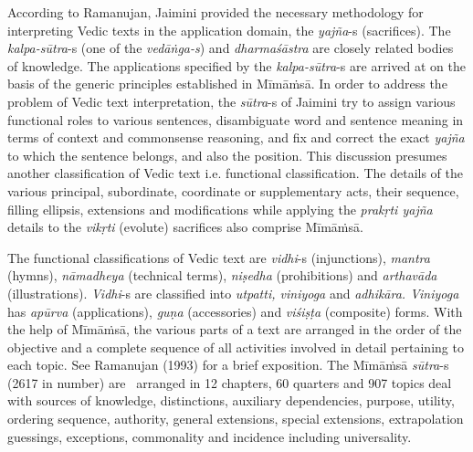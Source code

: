 According to Ramanujan, Jaimini provided the necessary methodology for interpreting Vedic texts in the application domain, the \textit{yajña}-s (sacrifices). The \textit{kalpa-sūtra}-s (one of the \textit{vedāṅga-s}) and \textit{dharmaśāstra} are closely related bodies of knowledge. The applications specified by the \textit{kalpa-sūtra}-s are arrived at on the basis of the generic principles established in Mīmāṁsā. In order to address the problem of Vedic text interpretation, the \textit{sūtra}-s of Jaimini try to assign various functional roles to various sentences, disambiguate word and sentence meaning in terms of context and commonsense reasoning, and fix and correct the exact \textit{yajña} to which the sentence belongs, and also the position. This discussion presumes another classification of Vedic text i.e. functional classification. The details of the various principal, subordinate, coordinate or supplementary acts, their sequence, filling ellipsis, extensions and modifications while applying the \textit{prakṛti yajña} details to the \textit{vikṛti} (evolute) sacrifices also comprise Mīmāṁsā.

\vskip 3pt

The functional classifications of Vedic text are \textit{vidhi}-s (injunctions), \textit{mantra} (hymns), \textit{nāmadheya} (technical terms), \textit{niṣedha} (prohibitions) and \textit{arthavāda} (illustrations). \textit{Vidhi}-s are classified into \textit{utpatti, viniyoga} and \textit{adhikāra. Viniyoga} has \textit{apūrva} (applications), \textit{guṇa} (accessories) and \textit{viśiṣṭa} (composite) forms. With the help of Mīmāṁsā, the various parts of a text are arranged in the order of the objective and a complete sequence of all activities involved in detail pertaining to each topic. See Ramanujan (1993) for a brief exposition. The Mīmāṁsā \hbox{\textit{sūtra}-s} (2617 in number) are  arranged in 12 chapters, 60 quarters and 907 topics deal with sources of knowledge, distinctions, auxiliary dependencies, purpose, utility, ordering sequence, authority, general extensions, special extensions, extrapolation guessings, exceptions, commonality and incidence including universality.

